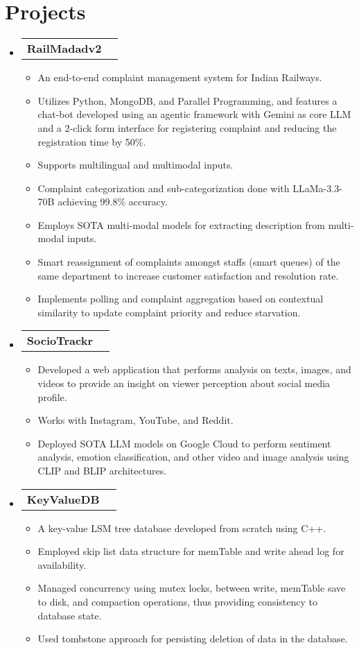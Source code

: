 \documentclass[letterpaper,11pt]{article}
\makeatletter
\newcommand{\resumeItem}[1]{
  \item\small{
    {#1 \vspace{-2pt}}
  }
}
\newcommand{\resumeProjectHeading}[2]{
    \item
    \begin{tabular*}{0.97\textwidth}{l@{\extracolsep{\fill}}r}
      \small#1 & #2 \\
    \end{tabular*}\vspace{-7pt}
}
\newcommand{\resumeSubHeadingListStart}{\begin{itemize}[leftmargin=0.15in, label={}]}
\newcommand{\resumeSubHeadingListEnd}{\end{itemize}}
\newcommand{\resumeItemListStart}{\begin{itemize}}
\newcommand{\resumeItemListEnd}{\end{itemize}\vspace{-5pt}}
\makeatother
\begin{document}
\section{Projects}
    \resumeSubHeadingListStart
      \resumeProjectHeading
          {\textbf{RailMadadv2}}{}
          \resumeItemListStart
            \resumeItem{An end-to-end complaint management system for Indian Railways.}
            \resumeItem{Utilizes Python, MongoDB, and Parallel Programming, and features a chat-bot developed using an agentic framework with Gemini as core LLM and a 2-click form interface for registering complaint and reducing the registration time by 50\%.}
            \resumeItem{Supports multilingual and multimodal inputs.}
            \resumeItem{Complaint categorization and sub-categorization done with LLaMa-3.3-70B achieving 99.8\% accuracy.}
            \resumeItem{Employs SOTA multi-modal models for extracting description from multi-modal inputs.}
            \resumeItem{Smart reassignment of complaints amongst staffs (smart queues) of the same department to increase customer satisfaction and resolution rate.}
            \resumeItem{Implements polling and complaint aggregation based on contextual similarity to update complaint priority and reduce starvation.}
          \resumeItemListEnd
      \resumeProjectHeading
          {\textbf{SocioTrackr}}{}
          \resumeItemListStart
            \resumeItem{Developed a web application that performs analysis on texts, images, and videos to provide an insight on viewer perception about social media profile.}
            \resumeItem{Works with Instagram, YouTube, and Reddit.}
            \resumeItem{Deployed SOTA LLM models on Google Cloud to perform sentiment analysis, emotion classification, and other video and image analysis using CLIP and BLIP architectures.}
          \resumeItemListEnd
      \resumeProjectHeading
          {\textbf{KeyValueDB}}{}
          \resumeItemListStart
            \resumeItem{A key-value LSM tree database developed from scratch using C++.}
            \resumeItem{Employed skip list data structure for memTable and write ahead log for availability.}
            \resumeItem{Managed concurrency using mutex locks, between write, memTable save to disk, and compaction operations, thus providing consistency to database state.}
            \resumeItem{Used tombstone approach for persisting deletion of data in the database.}
          \resumeItemListEnd
    \resumeSubHeadingListEnd

\end{document}
